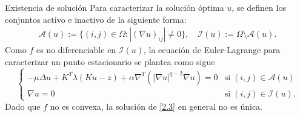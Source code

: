 \documentclass[9pt]{beamer}
\begin{document}
\begin{frame}{Existencia de solución}
 Para caracterizar la solución óptima $u$, se definen los conjuntos activo e inactivo de la siguiente forma:
    \begin{align*}
        \mathcal{A}(u):=\{(i,j)\in \Omega:|(\nabla u)_{ij}|\neq 0\},\quad
        \mathcal{I}(u):=\Omega \setminus \mathcal{A}(u).
    \end{align*}
  Como $f$ es no diferenciable en $\mathcal{I}(u)$, la ecuación de Euler-Lagrange para caracterizar un punto estacionario se plantea como sigue 
    \begin{equation}
        \left\{\begin{array}{ll}
            -\mu\Delta u+K^T\lambda(Ku-z)+\alpha\nabla^T(|\nabla u|^{q-2}\nabla u)=0&\text{si}\;(i,j)\in\mathcal{A}(u)\\
            \nabla u=0&\text{si}\;(i,j)\in \mathcal{I}(u).
        \end{array}\right.
        \label{2.3}
    \end{equation}
    Dado que $f$ no es convexa, la solución de \eqref{2.3} en general no es única. 
\end{frame}
\end{document}
